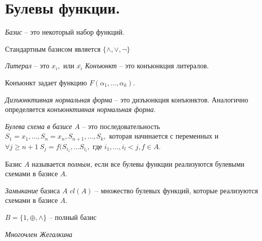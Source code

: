 
\section{Булевы функции.}

\begin{definition}
    \textit{Базис} -- это некоторый набор функций.
\end{definition}

\begin{example}
    Стандартным базисом является $\{ \wedge, \vee, \neg \}$
\end{example}

\begin{definition}
    \textit{Литерал} -- это $x_i,$ или $\overline{x_i}$
    \textit{Конъюнкт} -- это конъюнкция литералов.
\end{definition}

Конъюнкт задает функцию $F(\alpha_1, \ldots, \alpha_k).$

\begin{definition}
    \textit{Дизъюнктивная нормальная форма} -- это дизъюнкция конъюнктов. Аналогично определяется \textit{конъюнктивная нормальная форма}.
\end{definition}

\begin{definition}
    \textit{Булева схема в базисе $A$} -- это последовательность $S_1 = x_1, \ldots, S_n = x_n, S_{n + 1}, \ldots, S_k,$ которая начинается с переменных и $\forall j \geq n + 1 \ S_j = f(S_{i_1}, \ldots S_{i_l},$  где $i_1, \ldots, i_l < j, f \in A.$
\end{definition}

\begin{definition}
    Базис $A$ называется \textit{полным,} если все булевы функции реализуются булевыми схемами в базисе $A.$
\end{definition}

\begin{definition}
    \textit{Замыкание} базиса $A$ $cl(A)$ -- множество булевых функций, которые реализуются схемами в базисе $A.$
\end{definition}

\begin{proposition}
    $B = \{1, \oplus, \wedge\}$ -- полный базис
\end{proposition}

\begin{definition}
    \textit{Многочлен Жегалкина}
\end{definition}


